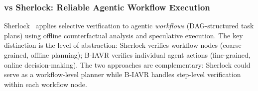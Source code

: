 \subsubsection{vs Sherlock: Reliable Agentic Workflow Execution}

Sherlock~\cite{sherlock2025} applies selective verification to agentic \textit{workflows} (DAG-structured task plans) using offline counterfactual analysis and speculative execution. The key distinction is the level of abstraction: Sherlock verifies workflow nodes (coarse-grained, offline planning); B-IAVR verifies individual agent actions (fine-grained, online decision-making). The two approaches are complementary: Sherlock could serve as a workflow-level planner while B-IAVR handles step-level verification within each workflow node.


